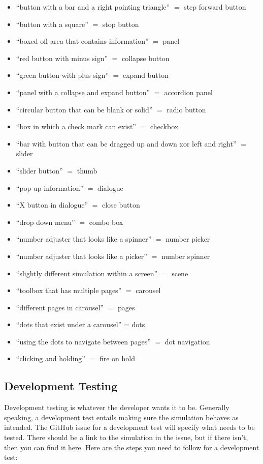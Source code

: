 \documentclass[titlepage]{article}
\begin{document}
\begin{itemize}
			\item  ``button with a bar and a right pointing triangle'' $ = $ step forward button
			\item ``button with a square'' $ = $ stop button
			\item ``boxed off area that contains information'' $ = $ panel
			\item ``red button with minus sign'' $ = $ collapse button
			\item ``green button with plus sign'' $ = $ expand button
			\item ``panel with a collapse and expand button'' $ = $ accordion panel
			\item ``circular button that can be blank or solid'' $ = $ radio button
			\item ``box in which a check mark can exist'' $ = $ checkbox
			\item ``bar with button that can be dragged up and down xor left and right'' $ = $ slider
			\item ``slider button'' $ = $ thumb
			\item ``pop-up information'' $ = $ dialogue
			\item ``X button in dialogue'' $ = $ close button
			\item ``drop down menu'' $ = $ combo box
			\item ``number adjuster that looks like a spinner'' $ = $ number picker
			\item ``number adjuster that looks like a picker'' $ = $ number spinner
			\item ``slightly different simulation within a screen'' $ = $ scene
			\item ``toolbox that has multiple pages'' $ = $ carousel
			\item ``different pages in carousel'' $ = $ pages
			\item ``dots that exist under a carousel'' = dots
			\item ``using the dots to navigate between pages'' $ = $ dot navigation
			\item ``clicking and holding'' $ = $ fire on hold
		\end{itemize}

	\subsection{Development Testing}

Development testing is whatever the developer wants it to be. Generally speaking, a development test entails making sure the simulation behaves as intended. The GitHub issue for a development test will specify what needs to be tested. There should be a link to the simulation in the issue, but if there isn't, then you can find it \href{https://phet-dev.colorado.edu/html/}{here}. Here are the steps you need to follow for a development test:
\end{document}
